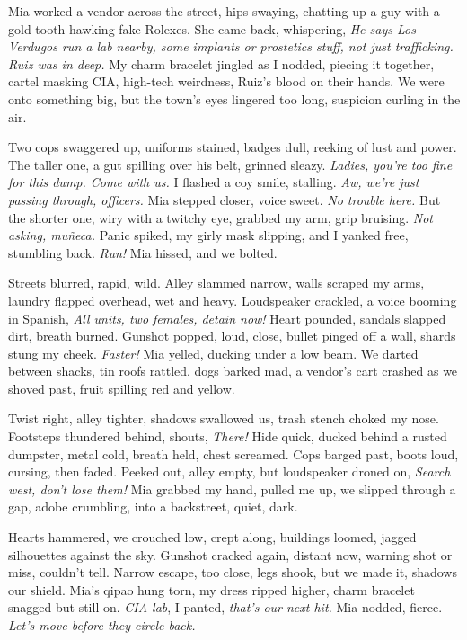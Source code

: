 \documentclass[12pt,oneside]{book}
\begin{document}
Mia worked a vendor across the street, hips swaying, chatting up a guy with a gold tooth hawking fake Rolexes. She came back, whispering, \textit{He says Los Verdugos run a lab nearby, some implants or prostetics stuff, not just trafficking. Ruiz was in deep.} My charm bracelet jingled as I nodded, piecing it together, cartel masking CIA, high-tech weirdness, Ruiz’s blood on their hands. We were onto something big, but the town’s eyes lingered too long, suspicion curling in the air.

Two cops swaggered up, uniforms stained, badges dull, reeking of lust and power. The taller one, a gut spilling over his belt, grinned sleazy. \textit{Ladies, you’re too fine for this dump. Come with us.} I flashed a coy smile, stalling. \textit{Aw, we’re just passing through, officers.} Mia stepped closer, voice sweet. \textit{No trouble here.} But the shorter one, wiry with a twitchy eye, grabbed my arm, grip bruising. \textit{Not asking, muñeca.} Panic spiked, my girly mask slipping, and I yanked free, stumbling back. \textit{Run!} Mia hissed, and we bolted.

Streets blurred, rapid, wild. Alley slammed narrow, walls scraped my arms, laundry flapped overhead, wet and heavy. Loudspeaker crackled, a voice booming in Spanish, \textit{All units, two females, detain now!} Heart pounded, sandals slapped dirt, breath burned. Gunshot popped, loud, close, bullet pinged off a wall, shards stung my cheek. \textit{Faster!} Mia yelled, ducking under a low beam. We darted between shacks, tin roofs rattled, dogs barked mad, a vendor’s cart crashed as we shoved past, fruit spilling red and yellow.

Twist right, alley tighter, shadows swallowed us, trash stench choked my nose. Footsteps thundered behind, shouts, \textit{There!} Hide quick, ducked behind a rusted dumpster, metal cold, breath held, chest screamed. Cops barged past, boots loud, cursing, then faded. Peeked out, alley empty, but loudspeaker droned on, \textit{Search west, don’t lose them!} Mia grabbed my hand, pulled me up, we slipped through a gap, adobe crumbling, into a backstreet, quiet, dark.

Hearts hammered, we crouched low, crept along, buildings loomed, jagged silhouettes against the sky. Gunshot cracked again, distant now, warning shot or miss, couldn’t tell. Narrow escape, too close, legs shook, but we made it, shadows our shield. Mia’s qipao hung torn, my dress ripped higher, charm bracelet snagged but still on. \textit{CIA lab}, I panted, \textit{that’s our next hit.} Mia nodded, fierce. \textit{Let’s move before they circle back.}
\end{document}
